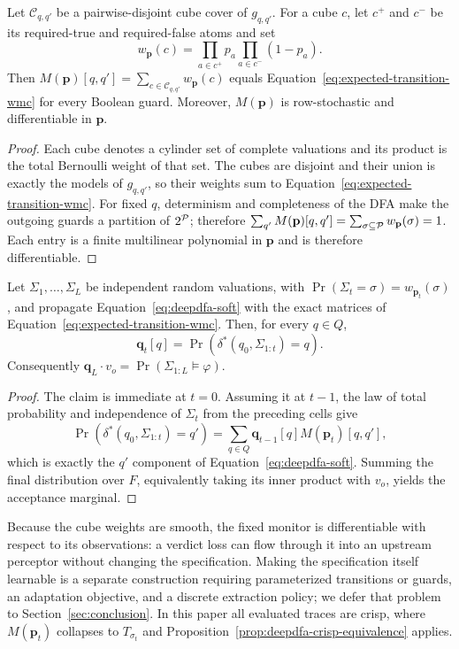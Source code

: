 \begin{proposition}
\label{prop:deepdfa-exact-wmc}
Let $\mathcal C_{q,q'}$ be a pairwise-disjoint cube cover of $g_{q,q'}$. For a cube $c$, let $c^+$ and $c^-$ be its required-true and required-false atoms and set
\[
  w_{\mathbf p}(c)=\prod_{a\in c^+}p_a\prod_{a\in c^-}(1-p_a).
\]
Then $M(\mathbf p)[q,q']=\sum_{c\in\mathcal C_{q,q'}}w_{\mathbf p}(c)$ equals Equation~\eqref{eq:expected-transition-wmc} for every Boolean guard. Moreover, $M(\mathbf p)$ is row-stochastic and differentiable in $\mathbf p$.
\end{proposition}

\begin{proof}
Each cube denotes a cylinder set of complete valuations and its product is the total Bernoulli weight of that set. The cubes are disjoint and their union is exactly the models of $g_{q,q'}$, so their weights sum to Equation~\eqref{eq:expected-transition-wmc}. For fixed $q$, determinism and completeness of the DFA make the outgoing guards a partition of $2^{{\mathcal{P}}}$; therefore $\sum_{q'}M(\mathbf p)[q,q']=\sum_{\sigma\subseteq{\ensuremath{\mathcal{P}}}}w_{\mathbf p}(\sigma)=1$. Each entry is a finite multilinear polynomial in $\mathbf p$ and is therefore differentiable.
\end{proof}

\begin{proposition}
\label{prop:deepdfa-trace-marginal}
Let $\Sigma_1,\ldots,\Sigma_L$ be independent random valuations, with $\Pr(\Sigma_t=\sigma)=w_{\mathbf p_t}(\sigma)$, and propagate Equation~\eqref{eq:deepdfa-soft} with the exact matrices of Equation~\eqref{eq:expected-transition-wmc}. Then, for every $q\in Q$,
\[
  \mathbf q_t[q]
  =\Pr\!\left(\delta^*(q_0,\Sigma_{1:t})=q\right).
\]
Consequently $\mathbf q_L\cdot v_o=\Pr(\Sigma_{1:L}\models\varphi)$.
\end{proposition}

\begin{proof}
The claim is immediate at $t=0$. Assuming it at $t-1$, the law of total probability and independence of $\Sigma_t$ from the preceding cells give
\[
  \Pr(\delta^*(q_0,\Sigma_{1:t})=q')
  =\sum_{q\in Q}\mathbf q_{t-1}[q]M(\mathbf p_t)[q,q'],
\]
which is exactly the $q'$ component of Equation~\eqref{eq:deepdfa-soft}. Summing the final distribution over $F$, equivalently taking its inner product with $v_o$, yields the acceptance marginal.
\end{proof}

Because the cube weights are smooth, the fixed monitor is differentiable with respect to its observations: a verdict loss can flow through it into an upstream perceptor without changing the specification. Making the specification itself learnable is a separate construction requiring parameterized transitions or guards, an adaptation objective, and a discrete extraction policy; we defer that problem to Section~\ref{sec:conclusion}. In this paper all evaluated traces are crisp, where $M(\mathbf p_t)$ collapses to $T_{\sigma_t}$ and Proposition~\ref{prop:deepdfa-crisp-equivalence} applies.
